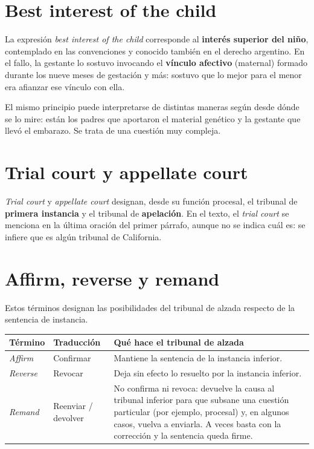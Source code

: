 \documentclass[12pt,oneside]{book}
\begin{document}
\section{Best interest of the child}

La expresión \textit{best interest of the child} corresponde al \textbf{interés superior del niño}, contemplado en las convenciones y conocido también en el derecho argentino. En el fallo, la gestante lo sostuvo invocando el \textbf{vínculo afectivo} (maternal) formado durante los nueve meses de gestación y más: sostuvo que lo mejor para el menor era afianzar ese vínculo con ella.

El mismo principio puede interpretarse de distintas maneras según desde dónde se lo mire: están los padres que aportaron el material genético y la gestante que llevó el embarazo. Se trata de una cuestión muy compleja.


\section{Trial court y appellate court}

\textit{Trial court} y \textit{appellate court} designan, desde su función procesal, el tribunal de \textbf{primera instancia} y el tribunal de \textbf{apelación}. En el texto, el \textit{trial court} se menciona en la última oración del primer párrafo, aunque no se indica cuál es: se infiere que es algún tribunal de California.

\section{Affirm, reverse y remand}

Estos términos designan las posibilidades del tribunal de alzada respecto de la sentencia de instancia.

\begin{table}[H]
\centering
\begin{tabularx}{\textwidth}{
    >{\raggedright\arraybackslash}p{}
    >{\raggedright\arraybackslash}p{}
    >{\raggedright\arraybackslash}X
}
\toprule
\textbf{Término} & \textbf{Traducción} & \textbf{Qué hace el tribunal de alzada} \\
\midrule
\textit{Affirm} & Confirmar & Mantiene la sentencia de la instancia inferior. \\
\textit{Reverse} & Revocar & Deja sin efecto lo resuelto por la instancia inferior. \\
\textit{Remand} & Reenviar / devolver & No confirma ni revoca: devuelve la causa al tribunal inferior para que subsane una cuestión particular (por ejemplo, procesal) y, en algunos casos, vuelva a enviarla. A veces basta con la corrección y la sentencia queda firme. \\
\bottomrule
\end{tabularx}
\end{table}
\end{document}
